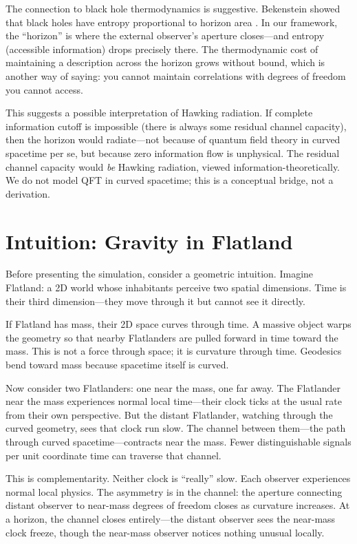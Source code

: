 \documentclass[11pt,a4paper]{article}
\begin{document}
The connection to black hole thermodynamics is suggestive. Bekenstein showed that black holes have entropy proportional to horizon area \cite{bekenstein1973}. In our framework, the ``horizon'' is where the external observer's aperture closes---and entropy (accessible information) drops precisely there. The thermodynamic cost of maintaining a description across the horizon grows without bound, which is another way of saying: you cannot maintain correlations with degrees of freedom you cannot access.

This suggests a possible interpretation of Hawking radiation. If complete information cutoff is impossible (there is always some residual channel capacity), then the horizon would radiate---not because of quantum field theory in curved spacetime per se, but because zero information flow is unphysical. The residual channel capacity would \emph{be} Hawking radiation, viewed information-theoretically. We do not model QFT in curved spacetime; this is a conceptual bridge, not a derivation.

\section{Intuition: Gravity in Flatland}

Before presenting the simulation, consider a geometric intuition. Imagine Flatland: a 2D world whose inhabitants perceive two spatial dimensions. Time is their third dimension---they move through it but cannot see it directly.

If Flatland has mass, their 2D space curves through time. A massive object warps the geometry so that nearby Flatlanders are pulled forward in time toward the mass. This is not a force through space; it is curvature through time. Geodesics bend toward mass because spacetime itself is curved.

Now consider two Flatlanders: one near the mass, one far away. The Flatlander near the mass experiences normal local time---their clock ticks at the usual rate from their own perspective. But the distant Flatlander, watching through the curved geometry, sees that clock run slow. The channel between them---the path through curved spacetime---contracts near the mass. Fewer distinguishable signals per unit coordinate time can traverse that channel.

This is complementarity. Neither clock is ``really'' slow. Each observer experiences normal local physics. The asymmetry is in the channel: the aperture connecting distant observer to near-mass degrees of freedom closes as curvature increases. At a horizon, the channel closes entirely---the distant observer sees the near-mass clock freeze, though the near-mass observer notices nothing unusual locally.
\end{document}
